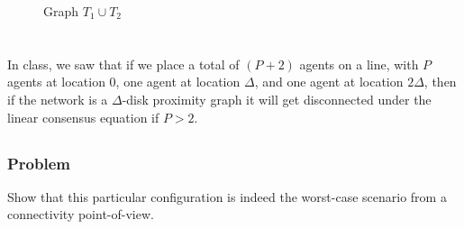 \documentclass[]{article}
\numberwithin{equation}{section}
\begin{document}
\begin{figure}[h]
    \centering
    \caption{Graph $T_1 \cup T_2$}
    \label{fig:pblm4_3}
\end{figure}


\newpage
\section{}
In class, we saw that if we place a total of $(P + 2)$ agents on a line, with $P$ agents at location 0, one agent at location $\Delta$, and one agent at location $2\Delta$, then if the network is a $\Delta$-disk proximity graph it will get disconnected under the linear consensus equation if $P > 2$.

\subsection{}
\subsubsection*{Problem}
Show that this particular configuration is indeed the worst-case scenario from a connectivity point-of-view.
\end{document}

